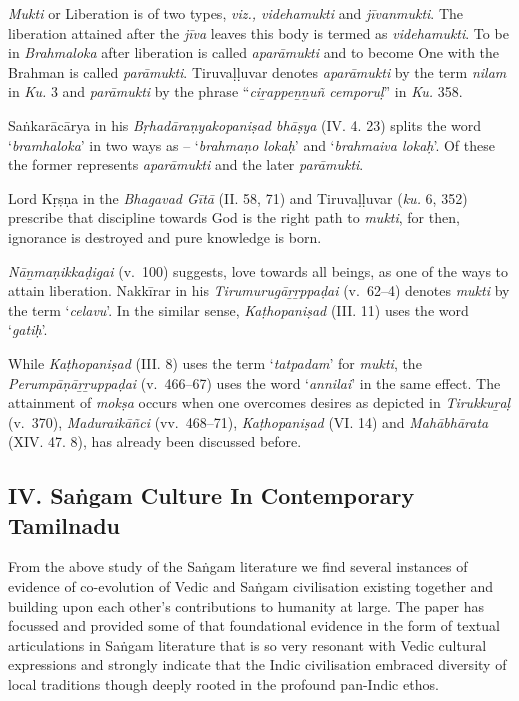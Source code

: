 \vskip -7.5pt

\textit{Mukti} or Liberation is of two types, \textit{viz., videhamukti} and \textit{jīvanmukti}. The liberation attained after the \textit{jīva} leaves this body is termed as \textit{videhamukti}. To be in \textit{Brahmaloka} after liberation is called \textit{aparāmukti} and to become One with the Brahman is called \textit{parāmukti}. Tiruvaḷḷuvar denotes \textit{aparāmukti} by the term \textit{nilam} in \textit{Ku.} 3 and \textit{parāmukti} by the phrase “\textit{ciṟappeṉṉuñ cemporuḷ}” in \textit{Ku.} 358.

Saṅkarācārya in his \textit{Bṛhadāraṇyakopaniṣad bhāṣya} (IV. 4. 23) splits the word ‘\textit{bramhaloka}’ in two ways as – ‘\textit{brahmaṇo lokaḥ}’ and ‘\textit{brahmaiva lokaḥ}’. Of these the former represents \textit{aparāmukti} and the later \textit{parāmukti}.

Lord Kṛṣṇa in the \textit{Bhagavad Gītā} (II. 58, 71) and Tiruvaḷḷuvar (\textit{ku.} 6, 352) prescribe that discipline towards God is the right path to \textit{mukti}, for then, ignorance is destroyed and pure knowledge is born.

\textit{Nāṉmaṇikkaḍigai} (v.~100) suggests, love towards all beings, as one of the ways to attain liberation. Nakkīrar in his \textit{Tirumurugāṟṟppaḍai} (v.~62–4) denotes \textit{mukti} by the term ‘\textit{celavu}’. In the similar sense, \textit{Kaṭhopaniṣad} (III. 11) uses the word ‘\textit{gatiḥ}’.

While \textit{Kaṭhopaniṣad} (III. 8) uses the term ‘\textit{tatpadam}’ for \textit{mukti}, the \textit{Perumpāṇāṟṟuppaḍai} (v.~466–67) uses the word ‘\textit{annilai}’ in the same effect. The attainment of \textit{mokṣa} occurs when one overcomes desires as depicted in \textit{Tirukkuṟaḷ} (v.~370), \textit{Maduraikāñci} (vv.~468–71), \textit{Kaṭhopaniṣad} (VI. 14) and \textit{Mahābhārata} (XIV. 47. 8), has already been discussed before.


\subsection*{IV. Saṅgam Culture In Contemporary Tamilnadu}

\vskip -7.5pt

From the above study of the Saṅgam literature we find several instances of evidence of co-evolution of Vedic and Saṅgam civilisation existing together and building upon each other’s contributions to humanity at large. The paper has focussed and provided some of that foundational evidence in the form of textual articulations in Saṅgam literature that is so very resonant with Vedic cultural expressions and strongly indicate that the Indic civilisation embraced diversity of local traditions though deeply rooted in the profound pan-Indic ethos.

